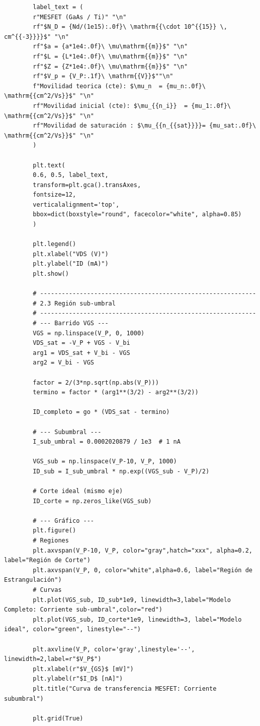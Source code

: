 \documentclass[a4paper]{article}
\begin{document}
\begin{verbatim}
		label_text = (
		r"MESFET (GaAs / Ti)" "\n"
		rf"$N_D = {Nd/(1e15):.0f}\ \mathrm{{\cdot 10^{{15}} \, cm^{{-3}}}}$" "\n"
		rf"$a = {a*1e4:.0f}\ \mu\mathrm{{m}}$" "\n"
		rf"$L = {L*1e4:.0f}\ \mu\mathrm{{m}}$" "\n"
		rf"$Z = {Z*1e4:.0f}\ \mu\mathrm{{m}}$" "\n"
		rf"$V_p = {V_P:.1f}\ \mathrm{{V}}$""\n"
		f"Movilidad teorica (cte): $\mu_n  = {mu_n:.0f}\ \mathrm{{cm^2/Vs}}$" "\n"
		rf"Movilidad inicial (cte): $\mu_{{n_i}}  = {mu_1:.0f}\ \mathrm{{cm^2/Vs}}$" "\n"
		rf"Movilidad de saturación : $\mu_{{n_{{sat}}}}= {mu_sat:.0f}\ \mathrm{{cm^2/Vs}}$" "\n"
		)
		
		plt.text(
		0.6, 0.5, label_text,
		transform=plt.gca().transAxes,
		fontsize=12,
		verticalalignment='top',
		bbox=dict(boxstyle="round", facecolor="white", alpha=0.85)
		)
		
		plt.legend()
		plt.xlabel("VDS (V)")
		plt.ylabel("ID (mA)")
		plt.show()
		
		# ------------------------------------------------------------
		# 2.3 Región sub-umbral
		# ------------------------------------------------------------
		# --- Barrido VGS ---
		VGS = np.linspace(V_P, 0, 1000)
		VDS_sat = -V_P + VGS - V_bi
		arg1 = VDS_sat + V_bi - VGS
		arg2 = V_bi - VGS
		
		factor = 2/(3*np.sqrt(np.abs(V_P)))
		termino = factor * (arg1**(3/2) - arg2**(3/2))
		
		ID_completo = go * (VDS_sat - termino)
		
		# --- Subumbral ---
		I_sub_umbral = 0.0002020879 / 1e3  # 1 nA
		
		VGS_sub = np.linspace(V_P-10, V_P, 1000)
		ID_sub = I_sub_umbral * np.exp((VGS_sub - V_P)/2)
		
		# Corte ideal (mismo eje)
		ID_corte = np.zeros_like(VGS_sub)
		
		# --- Gráfico ---
		plt.figure()
		# Regiones
		plt.axvspan(V_P-10, V_P, color="gray",hatch="xxx", alpha=0.2, label="Región de Corte")
		plt.axvspan(V_P, 0, color="white",alpha=0.6, label="Región de Estrangulación")
		# Curvas
		plt.plot(VGS_sub, ID_sub*1e9, linewidth=3,label="Modelo Completo: Corriente sub-umbral",color="red")
		plt.plot(VGS_sub, ID_corte*1e9, linewidth=3, label="Modelo ideal", color="green", linestyle="--")
		
		plt.axvline(V_P, color='gray',linestyle='--', linewidth=2,label=r"$V_P$")
		plt.xlabel(r"$V_{GS}$ [mV]")
		plt.ylabel(r"$I_D$ [nA]")
		plt.title("Curva de transferencia MESFET: Corriente subumbral")
		
		plt.grid(True)
		

\end{verbatim}
\end{document}
